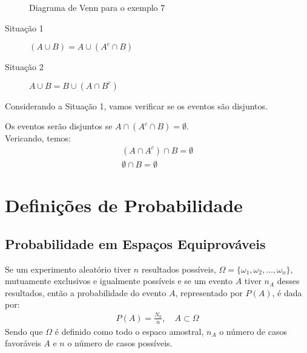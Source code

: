 \begin{description}
\begin{description}
\begin{example}
      \begin{figure}[H]
        \centering
        
        \caption{Diagrama de Venn para o exemplo 7}
        \label{fig:11}
      \end{figure}
      \begin{description}
        \item [Situação 1]

          $(A \cup B) = A \cup (A^c \cap B)$

        \item      [Situação 2]


          $A \cup B = B \cup (A \cap B^{c})$
      \end{description}
      Considerando a Situação 1, vamos verificar se os eventos são disjuntos.
      
      Os eventos serão disjuntos se $A \cap ( A^c \cap B )= \emptyset$. \\Vericando, temos: 
      \begin{align*}
        (A \cap A^c) \cap B = \emptyset \\
        \emptyset \cap B= \emptyset
      \end{align*}
\end{example}
\end{description}
\end{description}
\section{Definições de Probabilidade}
\subsection{Probabilidade em Espaços Equiprováveis}
Se um experimento aleatório tiver $n$ resultados possíveis, $\Omega = \{ \omega_1,\omega_2,\ldots,\omega_n \}$, mutuamente exclusivos e igualmente possíveis e se um evento $A$ tiver $n_A$ desses resultados, então a probabilidade do evento $A$, representado por $P(A)$, é dada por: 
\begin{align}
  P(A)= \frac{N_a}{n}, \quad A \subset \Omega 
\end{align}
Sendo que $\Omega$ é definido como todo o espaco amostral, $n_A$ o número de casos favoráveis $A$ e $n$ o número de casos possíveis.

